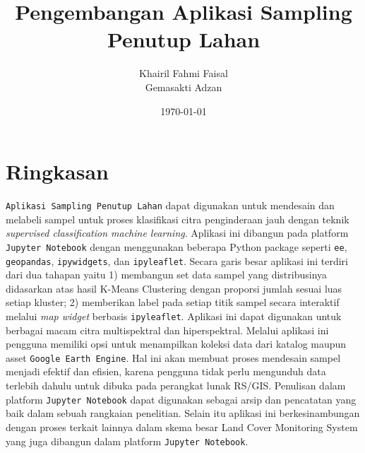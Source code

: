 \documentclass[a4paper,12pt]{article}
\begin{document}
\title{Pengembangan Aplikasi Sampling \\ Penutup Lahan}
\author{Khairil Fahmi Faisal \\ Gemasakti Adzan}
\date{\today}
\maketitle

\section{Ringkasan}
\texttt{Aplikasi Sampling Penutup Lahan} dapat digunakan untuk mendesain dan melabeli sampel untuk proses klasifikasi citra penginderaan jauh dengan teknik \textit{supervised classification machine learning}. Aplikasi ini dibangun pada platform \texttt{Jupyter Notebook} dengan menggunakan beberapa Python package seperti \texttt{ee}, \texttt{geopandas}, \texttt{ipywidgets}, dan \texttt{ipyleaflet}. Secara garis besar aplikasi ini terdiri dari dua tahapan yaitu 1) membangun set data sampel yang distribusinya didasarkan atas hasil K-Means Clustering dengan proporsi jumlah sesuai luas setiap kluster; 2) memberikan label pada setiap titik sampel secara interaktif melalui \textit{map widget} berbasis \texttt{ipyleaflet}. Aplikasi ini dapat digunakan untuk berbagai macam citra multispektral dan hiperspektral. Melalui aplikasi ini pengguna memiliki opsi untuk menampilkan koleksi data dari katalog maupun asset \texttt{Google Earth Engine}. Hal ini akan membuat proses mendesain sampel menjadi efektif dan efisien, karena pengguna tidak perlu mengunduh data terlebih dahulu untuk dibuka pada perangkat lunak RS/GIS. Penulisan dalam platform \texttt{Jupyter Notebook} dapat digunakan sebagai arsip dan pencatatan yang baik dalam sebuah rangkaian penelitian. Selain itu aplikasi ini berkesinambungan dengan proses terkait lainnya dalam skema besar Land Cover Monitoring System yang juga dibangun dalam platform \texttt{Jupyter Notebook}.
\end{document}
